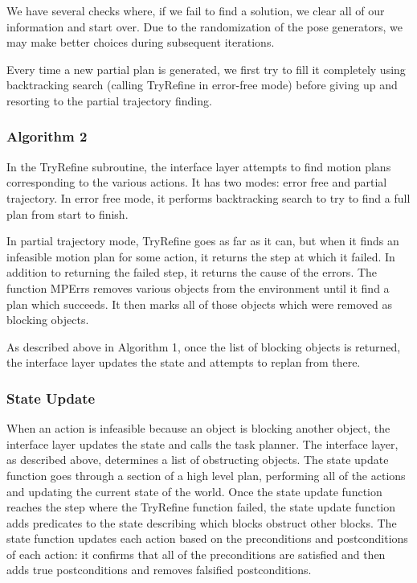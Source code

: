\documentclass[12pt]{article}
\begin{document}
We have several checks where, if we fail to find a solution, we clear all of our information and start over.  
Due to the randomization of the pose generators, we may make better choices during subsequent iterations.  

Every time a new partial plan is generated, we first try to fill it completely using backtracking search (calling TryRefine in error-free mode) before giving up and resorting to the partial trajectory finding.  

\subsubsection{Algorithm 2}


In the TryRefine subroutine, the interface layer attempts to find motion plans corresponding to the various actions.  
It has two modes: error free and partial trajectory.  
In error free mode, it performs backtracking search to try to find a full plan from start to finish.  

In partial trajectory mode, TryRefine goes as far as it can, but when it finds an infeasible motion plan for some action, it returns the step at which it failed.  
In addition to returning the failed step, it returns the cause of the errors.  
The function MPErrs removes various objects from the environment until it find a plan which succeeds.  
It then marks all of those objects which were removed as blocking objects.

As described above in Algorithm 1, once the list of blocking objects is returned, the interface layer updates the state and attempts to replan from there.

\subsubsection{State Update}

When an action is infeasible because an object is blocking another object, the interface layer updates the state and calls the task planner. 
The interface layer, as described above, determines a list of obstructing objects.
The state update function goes through a section of a high level plan, performing all of the actions and updating the current state of the world.
Once the state update function reaches the step where the TryRefine function failed, the state update function adds predicates to the state describing which blocks obstruct other blocks.
The state function updates each action based on the preconditions and postconditions of each action: it confirms that all of the preconditions are satisfied and then adds true postconditions and removes falsified postconditions.  
\end{document}
